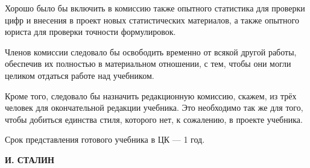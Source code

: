 \documentclass[12pt, a4paper, openany]{book}
\begin{document}
Хорошо было бы включить в комиссию также опытного статистика для проверки цифр и внесения в проект новых статистических материалов, а также опытного юриста для проверки точности формулировок.



Членов комиссии следовало бы освободить временно от всякой другой работы, обеспечив их полностью в материальном отношении, с тем, чтобы они могли целиком отдаться работе над учебником.



Кроме того, следовало бы назначить редакционную комиссию, скажем, из трёх человек для окончательной редакции учебника. Это необходимо так же для того, чтобы добиться единства стиля, которого нет, к сожалению, в проекте учебника.



Срок представления готового учебника в ЦК — 1 год.



\begin{flushright}



\textbf{И. СТАЛИН}



\end{flushright}






\newpage

\thispagestyle{empty} %

\ \\



\ \\



\ \\



\ \\



\ \\



\section[ОТВЕТ т-щу НОТКИНУ, Александру Ильичу]{}
\end{document}
